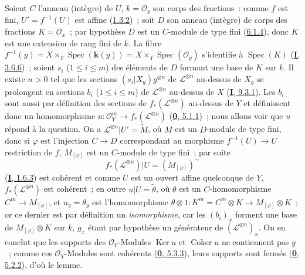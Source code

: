 Soient $C$ l'anneau (intègre) de $U$, $k=\mathcal{O}_y$ son corps des
fractions~: comme $f$ est fini, $U'=f^{-1}(U)$ est affine
(\hyperref[II.1.3.2-fr]{1.3.2})~; soit $D$ son anneau (intègre) de corps des
fractions $K=\mathcal{O}_x$~; par hypothèse $D$ est un $C$-module de type
fini (\hyperref[II.6.1.4-fr]{6.1.4}), donc $K$ est une extension de rang fini
de $k$. La fibre
$f^{-1}(y)=X\times_Y\operatorname{Spec}(\boldsymbol{k}(y))=X\times_Y\operatorname{Spec}(\mathcal{O}_y)$
s'identifie à $\operatorname{Spec}(K)$
(\hyperref[I.3.6.5-fr]{\textbf{I}, 3.6.6})~; soient $s_i$ ($1\leq i\leq m$) des
éléments de $D$ formant une base de $K$ sur $k$. Il existe $n>0$ tel que les
sections $(s_i|X_g)g^{\otimes n}$ de $\mathcal{L}^{\otimes n}$ au-dessus de
$X_g$ se prolongent en sections $b_i$ ($1\leq i\leq m$) de
$\mathcal{L}^{\otimes n}$ au-dessus de $X$
(\hyperref[I.9.3.1-fr]{\textbf{I}, 9.3.1}). Les $b_i$ sont aussi par définition des
sections de $f_*(\mathcal{L}^{\otimes n})$ au-dessus de $Y$ et définissent
donc un homomorphisme
$u:\mathcal{O}_Y^m\to f_*(\mathcal{L}^{\otimes n})$
(\hyperref[0.5.1.1-fr]{\textbf{0}, 5.1.1})~; nous allons voir que $u$ répond à la
question. On a $\mathcal{L}^{\otimes n}|U'=\widetilde{M}$, où $M$ est un
$D$-module de type fini, donc si $\varphi$ est l'injection $C\to D$
correspondant au morphisme $f^{-1}(U)\to U$ restriction de $f$,
$M_{[\varphi]}$ est un $C$-module de type fini~; par suite
\[
f_*(\mathcal{L}^{\otimes n})|U=(M_{[\varphi]})^\sim
\]
(\hyperref[I.1.6.3-fr]{\textbf{I}, 1.6.3}) est cohérent et comme $U$ est un ouvert
affine quelconque de $Y$, $f_*(\mathcal{L}^{\otimes n})$ est cohérent~; en
outre $u|U=\widetilde{\theta}$, où $\theta$ est un $C$-homomorphisme
$C^m\to M_{[\varphi]}$, et $u_y=\theta_y$ est l'homomorphisme
$\theta\otimes1:K^m=C^m\otimes K\longrightarrow M_{[\varphi]}\otimes K$~;
or ce dernier est par définition un \emph{isomorphisme}, car les $(b_i)_x$
forment une base de $M_{[\varphi]}\otimes K$ sur $k$, $g_x$ étant par
hypothèse un générateur de $(\mathcal{L}^{\otimes n})_x$. On en conclut que
les supports des $\mathcal{O}_Y$-Modules $\operatorname{Ker}u$ et
$\operatorname{Coker}u$ ne contiennent pas $y$~; comme ces
$\mathcal{O}_Y$-Modules sont cohérents
(\hyperref[0.5.3.3-fr]{\textbf{0}, 5.3.3}), leurs supports sont fermés
(\hyperref[0.5.2.2-fr]{\textbf{0}, 5.2.2}), d'où le lemme.

